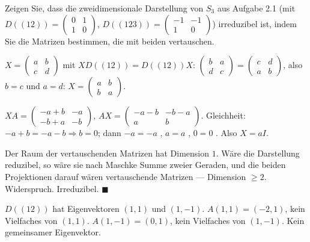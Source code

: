 \begin{aufgabe}
Zeigen Sie, dass die zweidimensionale Darstellung von $S_3$ aus Aufgabe 2.1 (mit $D((12)) = \begin{pmatrix}0 & 1\\ 1 & 0\end{pmatrix}$, $D((123)) = \begin{pmatrix}-1 & -1\\ 1 & 0\end{pmatrix}$) irreduzibel ist, indem Sie die Matrizen bestimmen, die mit beiden vertauschen.

\loesung
{}
$X = \begin{pmatrix}a & b\\ c & d\end{pmatrix}$ mit $XD((12)) = D((12))X$: $\begin{pmatrix}b & a\\ d & c\end{pmatrix} = \begin{pmatrix}c & d\\ a & b\end{pmatrix}$, also $b = c$ und $a = d$: $X = \begin{pmatrix}a & b\\ b & a\end{pmatrix}$.

$XA = \begin{pmatrix}-a + b & -a\\ -b + a & -b\end{pmatrix}$, $AX = \begin{pmatrix}-a - b & -b - a\\ a & b\end{pmatrix}$. Gleichheit: $-a + b = -a - b\Rightarrow b = 0$; dann $-a = -a$ \checkmark, $a = a$ \checkmark, $0 = 0$ \checkmark. Also $X = aI$.

Der Raum der vertauschenden Matrizen hat Dimension $1$. Wäre die Darstellung reduzibel, so wäre sie nach Maschke Summe zweier Geraden, und die beiden Projektionen darauf wären vertauschende Matrizen --- Dimension $\ge2$. Widerspruch. Irreduzibel. $\blacksquare$

$D((12))$ hat Eigenvektoren $(1, 1)$ und $(1, -1)$. $A(1, 1) = (-2, 1)$, kein Vielfaches von $(1, 1)$. $A(1, -1) = (0, 1)$, kein Vielfaches von $(1, -1)$. Kein gemeinsamer Eigenvektor. \checkmark

\begin{center}
\begin{minipage}{0.88\textwidth}
\end{minipage}
\end{center}
\end{aufgabe}

